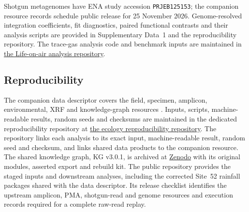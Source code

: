 \documentclass[fleqn,10pt,numbers]{olplainarticle}
\begin{document}
Shotgun metagenomes have ENA study accession \texttt{PRJEB125153}; the companion resource records schedule public release for 25 November 2026. Genome-resolved integration coefficients, fit diagnostics, paired functional contrasts and their analysis scripts are provided in Supplementary Data~1 and the reproducibility repository. The trace-gas analysis code and benchmark inputs are maintained in \href{https://github.com/bio-ontology-research-group/empty-quarter-lifeonair}{the Life-on-air analysis repository}.

\subsection*{Reproducibility}
The companion data descriptor covers the field, specimen, amplicon,
environmental, XRF and knowledge-graph resources \cite{rubalkhali_datapaper}.
Inputs, scripts, machine-readable results, random seeds and checksums are
maintained in the dedicated reproducibility repository at
\href{https://github.com/bio-ontology-research-group/empty-quarter-ecology}{the ecology reproducibility repository}.
The repository links each analysis to its exact input, machine-readable result,
random seed and checksum, and links shared data products to the companion
resource. The shared knowledge graph, KG v3.0.1, is archived at
\href{https://doi.org/10.5281/zenodo.23134168}{Zenodo} with its original modules,
asserted export and rebuild kit. The public repository provides the staged
inputs and downstream analyses, including the corrected Site~52 rainfall
packages shared with the data descriptor. Its release checklist identifies
the upstream amplicon, PMA, shotgun-read and genome resources and execution
records required for a complete raw-read replay.
\end{document}
